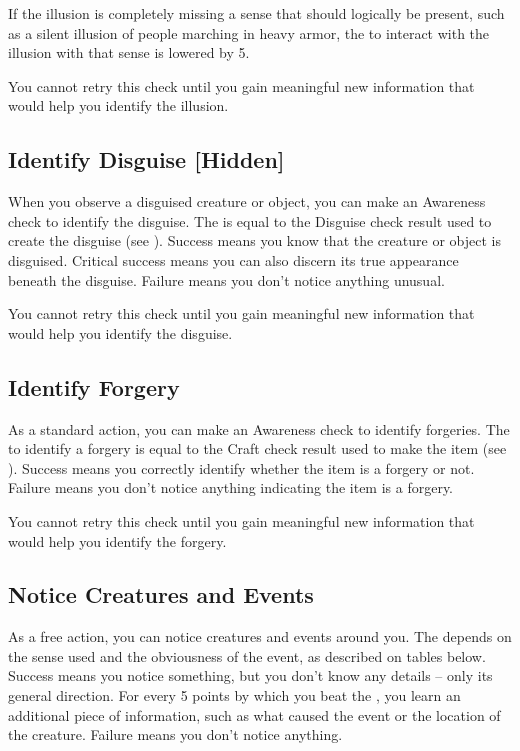         If the illusion is completely missing a sense that should logically be present, such as a silent illusion of people marching in heavy armor, the  to interact with the illusion with that sense is lowered by 5.

        You cannot retry this check until you gain meaningful new information that would help you identify the illusion.

    \subsection{Identify Disguise [Hidden]}\label{Identify Disguise}
        When you observe a disguised creature or object, you can make an Awareness check to identify the disguise.
        The  is equal to the Disguise check result used to create the disguise (see ).
        Success means you know that the creature or object is disguised.
        Critical success means you can also discern its true appearance beneath the disguise.
        Failure means you don't notice anything unusual.

        You cannot retry this check until you gain meaningful new information that would help you identify the disguise.

    \subsection{Identify Forgery}
        As a standard action, you can make an Awareness check to identify forgeries.
        The  to identify a forgery is equal to the Craft check result used to make the item (see ).
        Success means you correctly identify whether the item is a forgery or not.
        Failure means you don't notice anything indicating the item is a forgery.

        You cannot retry this check until you gain meaningful new information that would help you identify the forgery.

    \subsection{Notice Creatures and Events}\label{Notice Creatures and Events}
        As a free action, you can notice creatures and events around you.
        The  depends on the sense used and the obviousness of the event, as described on tables below.
        Success means you notice something, but you don't know any details -- only its general direction.
        For every 5 points by which you beat the , you learn an additional piece of information, such as what caused the event or the location of the creature.
        Failure means you don't notice anything.

